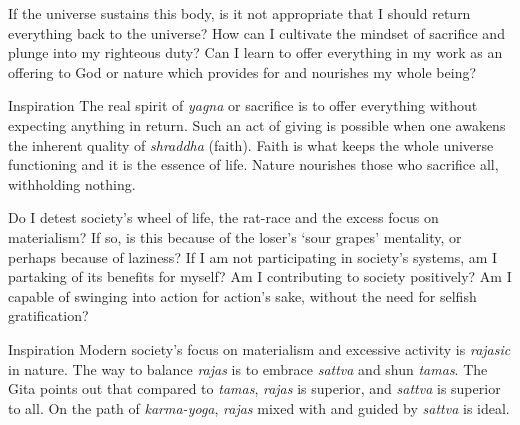


\newpage
\begin{mananam}{} 
\mananamtext If the universe sustains this body, is it not appropriate that I should return everything back to the universe? How can I cultivate the mindset of sacrifice and plunge into my righteous duty? Can I learn to offer everything in my work as an offering to God or nature which provides for and nourishes my whole being? 
\end{mananam}
\WritingHand{}
\begin{inspiration}{\mananamfont Inspiration}
\mananamtext The real spirit of \emph{yagna} or sacrifice is to offer everything without expecting anything in return. Such an act of giving is possible when one awakens the inherent quality of \emph{shraddha} (faith). Faith is what keeps the whole universe functioning and it is the essence of life. Nature nourishes those who sacrifice all, withholding nothing. 
\end{inspiration}
\newpage


\newpage
\begin{mananam}{} 
\mananamtext Do I detest society’s wheel of life, the rat-race and the excess focus on materialism? If so, is this because of the loser’s ‘sour grapes’ mentality, or perhaps because of laziness? If I am not participating in society’s systems, am I partaking of its benefits for myself? Am I contributing to society positively? Am I capable of swinging into action for action’s sake, without the need for selfish gratification?
\end{mananam}
\WritingHand{}
\begin{inspiration}{\mananamfont Inspiration}
\mananamtext Modern society’s focus on materialism and excessive activity is \emph{rajasic} in nature. The way to balance \emph{rajas} is to embrace \emph{sattva} and shun \emph{tamas}. The Gita points out that compared to \emph{tamas}, \emph{rajas} is superior, and \emph{sattva} is superior to all. On the path of \emph{karma-yoga}, \emph{rajas} mixed with and guided by \emph{sattva} is ideal. 
\end{inspiration}
\newpage

